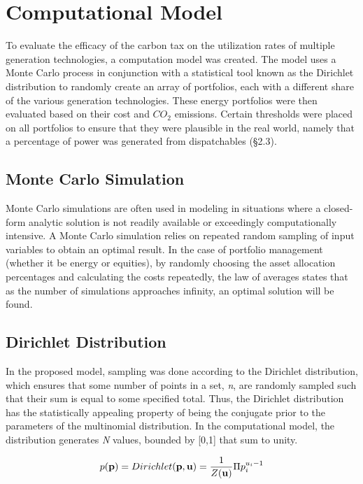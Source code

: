 \documentclass{article}
\begin{document}
\section{Computational Model}

To evaluate the efficacy of the carbon tax on the utilization rates of multiple generation technologies, a computation model was created. The model uses a Monte Carlo process in conjunction with a statistical tool known as the Dirichlet distribution to randomly create an array of portfolios, each with a different share of the various generation technologies. These energy portfolios were then evaluated based on their cost and $CO_2$ emissions. Certain thresholds were placed on all portfolios to ensure that they were plausible in the real world, namely that a percentage of power was generated from dispatchables (\S2.3). 

\subsection{Monte Carlo Simulation}
Monte Carlo simulations are often used in modeling in situations where a closed-form analytic solution is not readily available or exceedingly computationally intensive. A Monte Carlo simulation relies on repeated random sampling of input variables to obtain an optimal result. In the case of portfolio management (whether it be energy or equities), by randomly choosing the asset allocation percentages and calculating the costs repeatedly, the law of averages states that as the number of simulations approaches infinity, an optimal solution will be found. \*

\subsection{ Dirichlet Distribution}
In the proposed model, sampling was done according to the Dirichlet distribution, which ensures that some number of points in a set, \emph{n}, are randomly sampled such that their sum is equal to some specified total. Thus, the Dirichlet distribution has the statistically appealing property of being the conjugate prior to the parameters of the multinomial distribution. In the computational model, the distribution generates \emph{N} values, bounded by [0,1] that sum to unity. 

\begin{equation}
	p({\bf p}) = Dirichlet ({\bf p, u}) = \frac{1}{Z({\bf u})} \Pi p_{i}^{u_{i}-1}
\end{equation}
\end{document}
